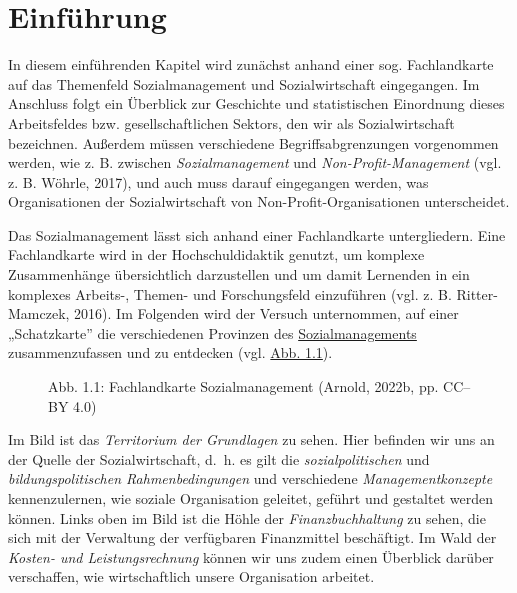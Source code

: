 \documentclass[
  letterpaper,
]{book}
\makeatletter
\newcommand*\pandocbounded[1]{%
  \sbox\pandoc@box{#1}%
  \Gscale@div\@tempa{\textheight}{\dimexpr\ht\pandoc@box+\dp\pandoc@box\relax}%
  \Gscale@div\@tempb{\linewidth}{\wd\pandoc@box}%
  \ifdim\@tempb\p@<\@tempa\p@\let\@tempa\@tempb\fi%
  \ifdim\@tempa\p@<\p@\scalebox{\@tempa}{\usebox\pandoc@box}%
  \else\usebox{\pandoc@box}%
  \fi%
}
\makeatother
\begin{document}
\chapter{Einführung}\label{einfuehrung}

In diesem einführenden Kapitel wird zunächst anhand einer sog.
Fachlandkarte auf das Themenfeld Sozialmanagement und Sozialwirtschaft
eingegangen. Im Anschluss folgt ein Überblick zur Geschichte und
statistischen Einordnung dieses Arbeitsfeldes bzw. gesellschaftlichen
Sektors, den wir als Sozialwirtschaft bezeichnen. Außerdem müssen
verschiedene Begriffsabgrenzungen vorgenommen werden, wie z. B. zwischen
\emph{Sozialmanagement} und \emph{Non-Profit-Management} (vgl. z. B.
Wöhrle, 2017), und auch muss darauf eingegangen werden, was
Organisationen der Sozialwirtschaft von Non-Profit-Organisationen
unterscheidet.

Das Sozialmanagement lässt sich anhand einer Fachlandkarte
untergliedern. Eine Fachlandkarte wird in der Hochschuldidaktik genutzt,
um komplexe Zusammenhänge übersichtlich darzustellen und um damit
Lernenden in ein komplexes Arbeits-, Themen- und Forschungsfeld
einzuführen (vgl. z. B. Ritter-Mamczek, 2016). Im Folgenden wird der
Versuch unternommen, auf einer „Schatzkarte'' die verschiedenen
Provinzen des
\href{https://de.wikipedia.org/wiki/Sozialmanagement}{Sozialmanagements}
zusammenzufassen und zu entdecken (vgl. \hyperref[figure11]{Abb. 1.1}).

\begin{figure}

\pandocbounded{\texttt{[image: images/figure11.png]}} \hfill{}

\caption{Abb. 1.1: Fachlandkarte Sozialmanagement (Arnold, 2022b, pp.
CC--BY 4.0)}

\end{figure}%

Im Bild ist das \emph{Territorium der Grundlagen} zu sehen. Hier
befinden wir uns an der Quelle der Sozialwirtschaft, d.~h. es gilt die
\emph{sozialpolitischen} und \emph{bildungspolitischen
Rahmenbedingungen} und verschiedene \emph{Managementkonzepte}
kennenzulernen, wie soziale Organisation geleitet, geführt und gestaltet
werden können. Links oben im Bild ist die Höhle der
\emph{Finanzbuchhaltung} zu sehen, die sich mit der Verwaltung der
verfügbaren Finanzmittel beschäftigt. Im Wald der \emph{Kosten- und
Leistungsrechnung} können wir uns zudem einen Überblick darüber
verschaffen, wie wirtschaftlich unsere Organisation arbeitet.
\end{document}
